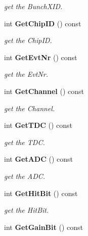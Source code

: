 \begin{DoxyCompactItemize}
\begin{DoxyCompactList}\small\item\em get the BunchXID. \item\end{DoxyCompactList}\item 
int {\bf GetChipID} () const \label{classCALICE_1_1LabviewBlock2_a6e1e7613bbf370e6a0e11ef3896bb6f9}

\begin{DoxyCompactList}\small\item\em get the ChipID. \item\end{DoxyCompactList}\item 
int {\bf GetEvtNr} () const \label{classCALICE_1_1LabviewBlock2_a8d4a67989cad5bf504971abc612653cc}

\begin{DoxyCompactList}\small\item\em get the EvtNr. \item\end{DoxyCompactList}\item 
int {\bf GetChannel} () const \label{classCALICE_1_1LabviewBlock2_a9636e5feb9a0cba799067f7b2390d25b}

\begin{DoxyCompactList}\small\item\em get the Channel. \item\end{DoxyCompactList}\item 
int {\bf GetTDC} () const \label{classCALICE_1_1LabviewBlock2_a57d069ac572fbc56de3abfaaa007eb6e}

\begin{DoxyCompactList}\small\item\em get the TDC. \item\end{DoxyCompactList}\item 
int {\bf GetADC} () const \label{classCALICE_1_1LabviewBlock2_ab3d5c72af2f3fa8dd180afb091455dee}

\begin{DoxyCompactList}\small\item\em get the ADC. \item\end{DoxyCompactList}\item 
int {\bf GetHitBit} () const \label{classCALICE_1_1LabviewBlock2_a98de016fe2fa0639ca0cc82b1eecf97f}

\begin{DoxyCompactList}\small\item\em get the HitBit. \item\end{DoxyCompactList}\item 
int {\bf GetGainBit} () const \label{classCALICE_1_1LabviewBlock2_a08c27201d04e385c9be5709ce2fb9525}


\end{DoxyCompactItemize}
